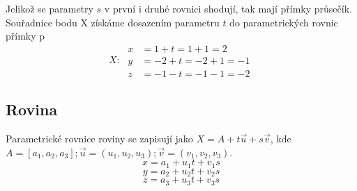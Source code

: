 \documentclass[12pt, a4paper]{scrartcl}
\begin{document}
    Jelikož se parametry $s$ v první i druhé rovnici shodují, tak mají přímky průsečík. 
    Souřadnice bodu X získáme dosazením parametru $t$ do parametrických rovnic přímky p
    \begin{equation*}
        X:\;\begin{aligned}
            x &= 1 + t = 1 + 1 = 2 \\
            y &= -2 + t = -2 + 1 = -1 \\
            z &= -1 - t = -1 - 1 = -2
        \end{aligned}
    \end{equation*}

    \subsection{Rovina}
    Parametrické rovnice roviny se zapisují jako $X = A + t \vec{u} + s \vec{v}$, 
    kde $A = [a_1, a_2, a_3]; \vec{u} = (u_1, u_2, u_3); \vec{v} = (v_1, v_2, v_3)$.
    \[x = a_1 + u_1 t + v_1 s\]
    \[y = a_2 + u_2 t + v_2 s\]
    \[z = a_3 + u_3 t + v_3 s\]
\end{document}

